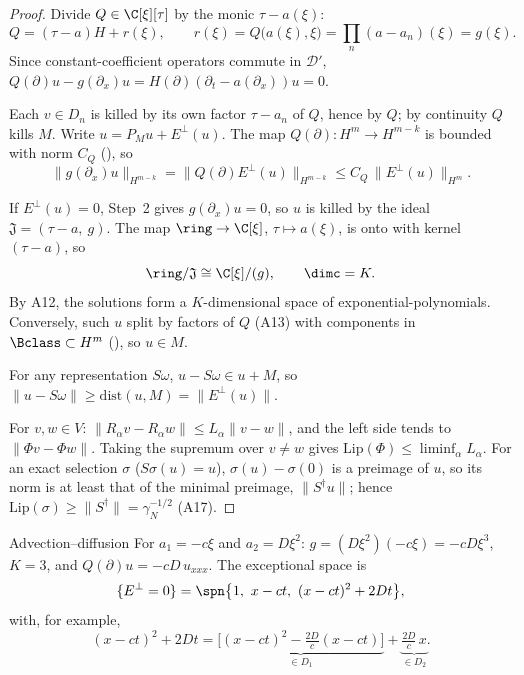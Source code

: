 \begin{proof}
Divide $Q\in\C[\xi][\tau]$ by the monic $\tau-a(\xi)$:
\[
Q=(\tau-a)H+r(\xi),\qquad r(\xi)=Q\big(a(\xi),\xi\big)=\prod_n(a-a_n)(\xi)=g(\xi).
\]
Since constant-coefficient operators commute in $\mathcal D'$, $Q(\partial)u-g(\partial_x)u=H(\partial)(\partial_t-a(\partial_x))u=0$.

Each $v\in D_n$ is killed by its own factor $\tau-a_n$ of $Q$, hence by $Q$; by continuity $Q$ kills $M$. Write $u=P_Mu+E^\perp(u)$. The map $Q(\partial):H^m\to H^{m-k}$ is bounded with norm $C_Q$ (), so
\[
\|g(\partial_x)u\|_{H^{m-k}}=\|Q(\partial)E^\perp(u)\|_{H^{m-k}}\le C_Q\,\|E^\perp(u)\|_{H^m}.
\]

If $E^\perp(u)=0$, Step~2 gives $g(\partial_x)u=0$, so $u$ is killed by the ideal $\mathfrak J=(\tau-a,\ g)$. The map $\ring\to\C[\xi]$, $\tau\mapsto a(\xi)$, is onto with kernel $(\tau-a)$, so
\[
\ring/\mathfrak J\cong\C[\xi]/(g),\qquad \dimc=K .
\]
By A12, the solutions form a $K$-dimensional space of exponential-polynomials. Conversely, such $u$ split by factors of $Q$ (A13) with components in $\Bclass\subset H^m$ (), so $u\in M$.

For any representation $S\omega$, $u-S\omega\in u+M$, so $\|u-S\omega\|\ge\mathrm{dist}(u,M)=\|E^\perp(u)\|$.

For $v,w\in V$: $\|R_\alpha v-R_\alpha w\|\le L_\alpha\|v-w\|$, and the left side tends to $\|\Phi v-\Phi w\|$. Taking the supremum over $v\ne w$ gives $\mathrm{Lip}(\Phi)\le\liminf_\alpha L_\alpha$. For an exact selection $\sigma$ ($S\sigma(u)=u$), $\sigma(u)-\sigma(0)$ is a preimage of $u$, so its norm is at least that of the minimal preimage, $\|S^\dagger u\|$; hence $\mathrm{Lip}(\sigma)\ge\|S^\dagger\|=\gamma_N^{-1/2}$ (A17).

\end{proof}

\begin{example}{Advection--diffusion}
For $a_1=-c\xi$ and $a_2=D\xi^2$: $g=(D\xi^2)(-c\xi)=-cD\xi^3$, $K=3$, and $Q(\partial)u=-cD\,u_{xxx}$. The exceptional space is
\[
\{E^\perp=0\}=\spn\big\{1,\ x-ct,\ (x-ct)^2+2Dt\big\},
\]
with, for example,
\[
(x-ct)^2+2Dt=\underbrace{\Big[(x-ct)^2-\tfrac{2D}{c}(x-ct)\Big]}_{\in D_1}+\underbrace{\tfrac{2D}{c}\,x}_{\in D_2}.
\]
\end{example}

